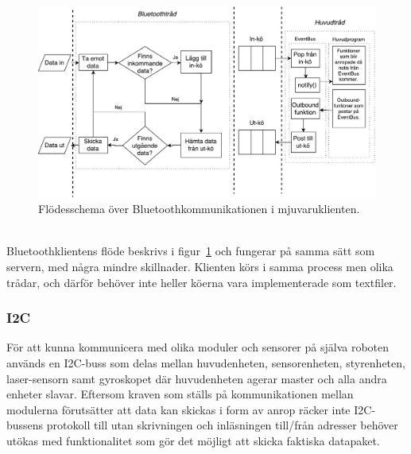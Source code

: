 \documentclass{article}
\begin{document}
\begin{figure}[H]
\centering
\includegraphics[scale=0.45]{bt-flow-software-client}
\caption{Flödesschema över Bluetoothkommunikationen i mjuvaruklienten.}
\label{fig:bt-flow-software-client}
\end{figure}
\ \\
Bluetoothklientens flöde beskrivs i figur~\ref{fig:bt-flow-software-client} och fungerar på samma sätt som servern, med några mindre skillnader. Klienten körs i samma process men olika trådar, och därför behöver inte heller köerna vara implementerade som textfiler.

\subsubsection{I2C}
\label{sec:i2c}
För att kunna kommunicera med olika moduler och sensorer på själva roboten används en I2C-buss som delas mellan huvudenheten, sensorenheten, styrenheten, laser-sensorn samt gyroskopet där huvudenheten agerar master och alla andra enheter slavar. Eftersom kraven som ställs på kommunikationen mellan modulerna förutsätter att data kan skickas i form av anrop räcker inte I2C-bussens protokoll till utan skrivningen och inläsningen till/från adresser behöver utökas med funktionalitet som gör det möjligt att skicka faktiska datapaket.
\end{document}
